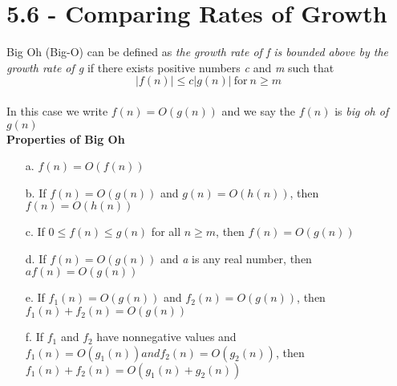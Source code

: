 \documentclass[10pt,twocolumn]{article}
\begin{document}
	\section*{5.6 - Comparing Rates of Growth}
        Big Oh (Big-O) can be defined as \textit{the growth rate of f is
          bounded above by the growth rate of g} if there exists positive
        numbers \textit{c} and \textit{m} such that \\
        \[ |f(n)| \leq c|g(n)| \: \textrm{for}\: n\geq m\]\\
        In this case we write $f(n) = O(g(n))$ and we say the $f(n)$ is \textit{big oh of $g(n)$}\\
        \textbf{Properties of Big Oh}\\
        \begin{itemize}
        \item[a.] $f(n)=O(f(n))$
        \item[b.] If $f(n)=O(g(n))$ and $ g(n)=O(h(n))$, then $f(n)=O(h(n))$
        \item[c.] If $0\leq f(n) \leq g(n)$ for all $n \geq m$, then $f(n)=O(g(n))$
        \item[d.] If $f(n)=O(g(n))$ and \textit{a} is any real number, then $af(n)=O(g(n))$
        \item[e.] If $f_1(n)=O(g(n))$ and $f_2(n)=O(g(n))$, then $f_1(n) + f_2(n) = O(g(n))$
        \item[f.] If $f_1$ and $f_2$ have nonnegative values and
          $f_1(n) = O(g_1(n)) and f_2(n) = O(g_2(n))$, then $f_1(n) +
          f_2(n) = O(g_1(n) + g_2(n))$
	\end{itemize}
\end{document}
